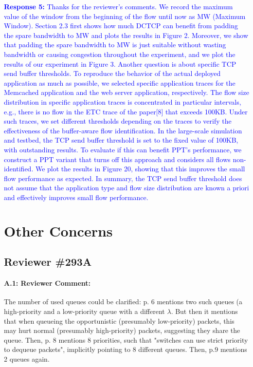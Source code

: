 \documentclass[12pt,one-column]{article}
\begin{document}
\noindent\textcolor{blue}{\textbf{Response 5:}
Thanks for the reviewer’s comments. 
We record the maximum value of the window from the beginning of the flow until now as MW (Maximum Window).
Section 2.3 first shows how much DCTCP can benefit from padding the spare bandwidth to MW and plots the results in Figure 2.
Moreover, we show that padding the spare bandwidth to MW is just suitable without wasting bandwidth or causing congestion throughout the experiment, and we plot the results of our experiment in Figure 3.
Another question is about specific TCP send buffer thresholds.
To reproduce the behavior of the actual deployed application as much as possible, we selected specific application traces for the Memcached application and the web server application, respectively.
The flow size distribution in specific application traces is concentrated in particular intervals, e.g., there is no flow in the ETC trace of the paper[8] that exceeds 100KB.
Under such traces, we set different thresholds depending on the traces to verify the effectiveness of the buffer-aware flow identification.
In the large-scale simulation and testbed, the TCP send buffer threshold is set to the fixed value of 100KB, with outstanding results.
To evaluate if this can benefit PPT’s performance, we construct a PPT variant that turns off this approach and considers all flows non-identified.
We plot the results in Figure 20, showing that this improves the small flow performance as expected.
In summary, the TCP send buffer threshold does not assume that the application type and flow size distribution are known a priori and effectively improves small flow performance.
}
	
\section{Other Concerns}
\subsection{Reviewer \#293A}
{\it \paragraph{A.1: Reviewer Comment:} The number of used queues could be clarified: p. 6 mentions two such queues (a high-priority and a low-priority queue with a different $\lambda$. But then it mentions that when queueing the opportunistic (presumably low-priority) packets, this may hurt normal (presumably high-priority) packets, suggesting they share the queue. Then, p. 8 mentions 8 priorities, such that "switches can use strict priority to dequeue packets", implicitly pointing to 8 different queues. Then, p.9 mentions 2 queues again. }
\end{document}
